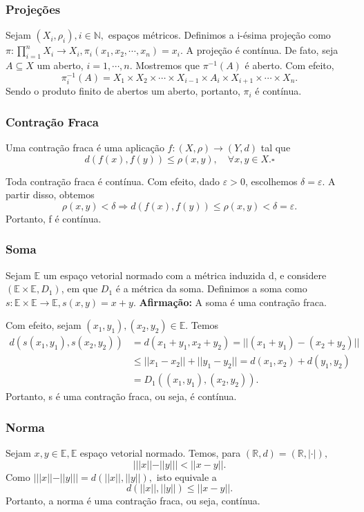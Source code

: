 \documentclass[metric_notes.tex]{subfiles}
\begin{document}
\subsubsection{Projeções}
Sejam \((X_{i}, \rho_{i}), i\in \mathbb{N},\) espaços métricos. Definimos a i-ésima projeção como
\(\pi :\prod\limits_{i=1}^{n}X_{i}\rightarrow X_{i}, \pi_{i}(x_1, x_2, \cdots, x_{n}) = x_{i}.\) A projeção
é contínua. De fato, seja \(A\subseteq{X}\) um aberto, \(i=1, \cdots, n.\) Mostremos que \(\pi^{-1}(A)\) é aberto.
Com efeito,
\[
	\pi_{i}^{-1}(A) = X_{1}\times X_{2}\times \cdots\times X_{i-1}\times A_{i}\times X_{i+1}\times \cdots\times X_{n}.
\]
Sendo o produto finito de abertos um aberto, portanto, \(\pi_{i}\) é contínua.
\subsubsection{Contração Fraca}
\begin{def*}
	Uma contração fraca é uma aplicação \(f:(X, \rho )\rightarrow (Y, d)\) tal que
	\[
		d(f(x), f(y))\leq \rho(x, y),\quad \forall x,y \in X.\square
	\]
\end{def*}
Toda contração fraca é contínua. Com efeito, dado \(\varepsilon > 0\), escolhemos \(\delta = \varepsilon\). A partir
disso, obtemos
\[
	\rho (x, y) < \delta \Rightarrow d(f(x), f(y))\leq \rho (x, y) < \delta =\varepsilon .
\]
Portanto, f é contínua.
\subsubsection{Soma}
Sejam \(\mathbb{E}\) um espaço vetorial normado com a métrica induzida d, e considere
\((\mathbb{E}\times \mathbb{E}, D_{1})\), em que \(D_{1}\) é a métrica da soma. Definimos a soma como
\(s:\mathbb{E}\times \mathbb{E}\rightarrow \mathbb{E}, s(x, y) = x + y.\)
\textbf{Afirmação:} A soma é uma contração fraca.

Com efeito, sejam \((x_{1}, y_{1}), (x_{2}, y_{2})\in \mathbb{E}.\) Temos
\begin{align*}
	d(s(x_{1}, y_{1}), s(x_{2}, y_{2})) & = d(x_{1}+y_{1}, x_{2}+y_{2}) = ||(x_{1}+y_{1})-(x_{2}+y_{2})||            \\
	                                    & \leq ||x_{1}-x_{2}|| + ||y_{1}-y_{2}|| = d(x_{1}, x_{2}) + d(y_{1}, y_{2}) \\
	                                    & =D_{1}((x_{1}, y_{1}), (x_{2}, y_{2})).
\end{align*}
Portanto, s é uma contração fraca, ou seja, é contínua.
\subsubsection{Norma}
Sejam \(x, y\in \mathbb{E}, \mathbb{E}\) espaço vetorial normado. Temos, para \((\mathbb{R}, d)=(\mathbb{R}, |\cdot |),\)
\[
	|||x||-||y||| < ||x-y||.
\]
Como \(|||x||-||y||| = d(||x||, ||y||),\) isto equivale a
\[
	d(||x||, ||y||)\leq ||x-y||.
\]
Portanto, a norma é uma contração fraca, ou seja, contínua.
\end{document}
